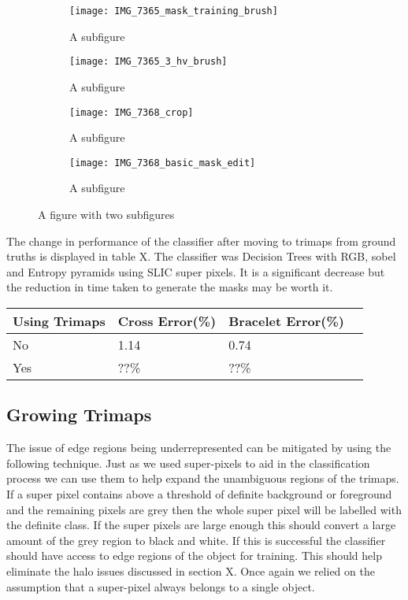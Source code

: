\documentclass[12pt]{IIBproject}
\begin{document}
\begin{figure}[H]
\centering
\begin{subfigure}{.45\textwidth}
  \centering
  \texttt{[image: IMG\_7365\_mask\_training\_brush]}
  \caption{A subfigure}
  \label{fig:sub1}
\end{subfigure}%
\begin{subfigure}{.45\textwidth}
  \centering
  \texttt{[image: IMG\_7365\_3\_hv\_brush]}
  \caption{A subfigure}
  \label{fig:sub2}
\end{subfigure}
\begin{subfigure}{.45\textwidth}
  \centering
  \texttt{[image: IMG\_7368\_crop]}
  \caption{A subfigure}
  \label{fig:sub2}
\end{subfigure}
\begin{subfigure}{.45\textwidth}
  \centering
  \texttt{[image: IMG\_7368\_basic\_mask\_edit]}
  \caption{A subfigure}
  \label{fig:sub2}
\end{subfigure}
\caption{A figure with two subfigures}
\label{fig:test}
\end{figure}
The change in performance of the classifier after moving to trimaps from ground truths is displayed in table X. The classifier was Decision Trees with RGB, sobel and Entropy pyramids using SLIC super pixels. It is a significant decrease but the reduction in time taken to generate the masks may be worth it.
\begin{center}
    \begin{tabular}{ | l | l | l | p{5cm} |}
    \hline
    Using Trimaps & Cross Error(\%) & Bracelet Error(\%) \\ \hline
    No & 1.14 & 0.74 \\ \hline
    Yes & ??\% & ??\% \\
    \hline
    
    \end{tabular}
    
\end{center}





\subsection{Growing Trimaps}
The issue of edge regions being underrepresented can be mitigated by using the following technique. Just as we used super-pixels to aid in the classification process we can use them to help expand the unambiguous regions of the trimaps. If a super pixel contains above a threshold of definite background or foreground and the remaining pixels are grey then the whole super pixel will be labelled with the definite class. If the super pixels are large enough this should convert a large amount of the grey region to black and white. If this is successful the classifier should have access to edge regions of the object for training. This should help eliminate the halo issues discussed in section X. Once again we relied on the assumption that a super-pixel always belongs to a single object.  
\end{document}
